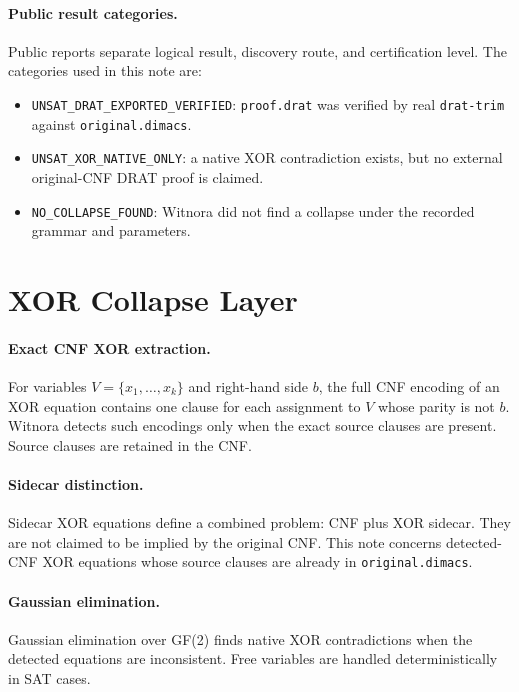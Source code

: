 \documentclass[10pt]{article}
\begin{document}
\paragraph{Public result categories.}
Public reports separate logical result, discovery route, and certification
level. The categories used in this note are:
\begin{itemize}
  \item \texttt{UNSAT\_DRAT\_EXPORTED\_VERIFIED}: \texttt{proof.drat} was
  verified by real \texttt{drat-trim} against \texttt{original.dimacs}.
  \item \texttt{UNSAT\_XOR\_NATIVE\_ONLY}: a native XOR contradiction exists,
  but no external original-CNF DRAT proof is claimed.
  \item \texttt{NO\_COLLAPSE\_FOUND}: Witnora did not find a collapse under
  the recorded grammar and parameters.
\end{itemize}

\section{XOR Collapse Layer}

\paragraph{Exact CNF XOR extraction.}
For variables \(V = \{x_1,\ldots,x_k\}\) and right-hand side \(b\), the full
CNF encoding of an XOR equation contains one clause for each assignment to
\(V\) whose parity is not \(b\). Witnora detects such encodings only when the
exact source clauses are present. Source clauses are retained in the CNF.

\paragraph{Sidecar distinction.}
Sidecar XOR equations define a combined problem: CNF plus XOR sidecar. They
are not claimed to be implied by the original CNF. This note concerns
detected-CNF XOR equations whose source clauses are already in
\texttt{original.dimacs}.

\paragraph{Gaussian elimination.}
Gaussian elimination over GF(2) finds native XOR contradictions when the
detected equations are inconsistent. Free variables are handled
deterministically in SAT cases.
\end{document}
